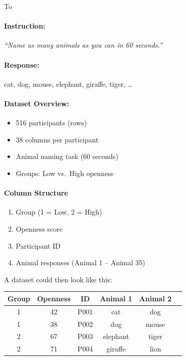 \begin{bsp} To 
\paragraph{Instruction:}
\textit{“Name as many animals as you can in 60 seconds.”}
\paragraph{Response:}
cat, dog, mouse, elephant, giraffe, tiger, \dots
\paragraph{Dataset Overview:}
\begin{itemize}
    \item 516 participants (rows)
    \item 38 columns per participant
    \item Animal naming task (60 seconds)
    \item Groups: Low vs.\ High openness
\end{itemize}
\paragraph{Column Structure}
\begin{enumerate}
    \item Group (1 = Low, 2 = High)
    \item Openness score
    \item Participant ID
    \item Animal responses (Animal 1 -- Animal 35)
\end{enumerate}
A dataset could then look like this:
\begin{center}
    \begin{tabular}{cccccc}
        \hline
        \textbf{Group} & \textbf{Openness} & \textbf{ID} & \textbf{Animal 1} & \textbf{Animal 2} \\
        \hline
        1 & 42 & P001 & cat      & dog    \\
        1 & 38 & P002 & dog      & mouse  \\
        2 & 67 & P003 & elephant & tiger  \\
        2 & 71 & P004 & giraffe  & lion   \\
        \hline
    \end{tabular}
\end{center}

\end{bsp}

